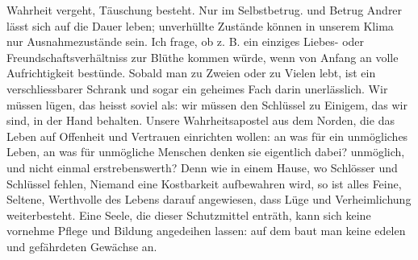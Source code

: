 Wahrheit vergeht, Täuschung besteht. Nur im Selbstbetrug. und Betrug Andrer lässt sich auf die Dauer leben; unverhüllte Zustände können in unserem Klima nur Ausnahmezustände sein. Ich frage, ob z. B. ein einziges Liebes- oder Freundschaftsverhältniss zur Blüthe kommen würde, wenn von Anfang an volle Aufrichtigkeit bestünde. Sobald man zu Zweien oder zu Vielen lebt, ist ein verschliessbarer Schrank und sogar ein geheimes Fach darin unerlässlich. Wir müssen lügen, das heisst soviel als: wir müssen den Schlüssel zu Einigem, das wir sind, in der Hand behalten. Unsere Wahrheitsapostel aus dem Norden, die das Leben auf Offenheit und Vertrauen einrichten wollen: an was für ein unmögliches Leben, an was für unmögliche Menschen denken sie eigentlich dabei? unmöglich, und nicht einmal erstrebenswerth? Denn wie in einem Hause, wo Schlösser und Schlüssel fehlen, Niemand eine Kostbarkeit aufbewahren wird, so ist alles Feine, Seltene, Werthvolle des Lebens darauf angewiesen, dass Lüge und Verheimlichung weiterbesteht. Eine Seele, die dieser Schutzmittel enträth, kann sich keine vornehme Pflege und Bildung angedeihen lassen: auf dem  baut man keine edelen und gefährdeten Gewächse an.
\par

